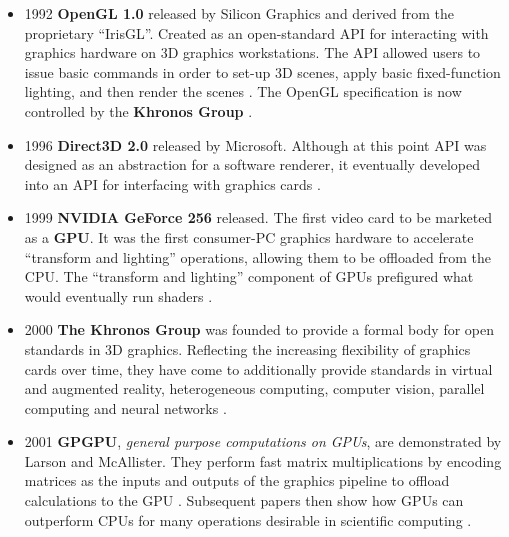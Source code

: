 \documentclass[a4paper,12pt,twoside,openright]{report}
\begin{document}
\begin{itemize}

    \item 1992 \textbf{OpenGL 1.0} released by Silicon Graphics and derived
    from the proprietary ``IrisGL''. Created as an open-standard API for
    interacting with graphics hardware on 3D graphics workstations. The API
    allowed users to issue basic commands in order to set-up 3D scenes, apply
    basic fixed-function lighting, and then render the scenes
    \cite{OpenGL_1_0}. The OpenGL specification is now controlled by the
    \textbf{Khronos Group} \cite{OpenGL} \cite{OpenGLToKhronos}.

    \item 1996 \textbf{Direct3D 2.0} released by Microsoft. Although at this
    point API was designed as an abstraction for a software renderer, it
    eventually developed into an API for interfacing with graphics cards
    \cite{JohnCarmackPlanDirect3DvsOpenGl}.


    \item 1999 \textbf{NVIDIA GeForce 256} released. The first video card to be
    marketed as a \textbf{GPU}. It was the first consumer-PC graphics hardware
    to accelerate ``transform and lighting'' operations, allowing them to be
    offloaded from the CPU. The ``transform and lighting'' component of GPUs
    prefigured what would eventually run shaders \cite{GeForce256}.

    \item 2000 \textbf{The Khronos Group} was founded to provide a formal body
    for open standards in 3D graphics. Reflecting the increasing flexibility of
    graphics cards over time, they have come to additionally provide standards
    in virtual and augmented reality, heterogeneous computing, computer vision,
    parallel computing and neural networks \cite{KhronosGroupAbout}.

    \item 2001 \textbf{GPGPU}, \textit{general purpose computations on GPUs},
    are demonstrated by Larson and McAllister. They perform fast matrix
    multiplications by encoding matrices as the inputs and outputs of the
    graphics pipeline to offload calculations to the GPU \cite{MatrixGPU}.
    Subsequent papers then show how GPUs can outperform CPUs for many
    operations desirable in scientific computing \cite{CUDAtoOpenCL}
    \cite{Kruger03linearalgebra} \cite{LUGPU} \cite{SparsematrixGPU}.


\end{itemize}
\end{document}
